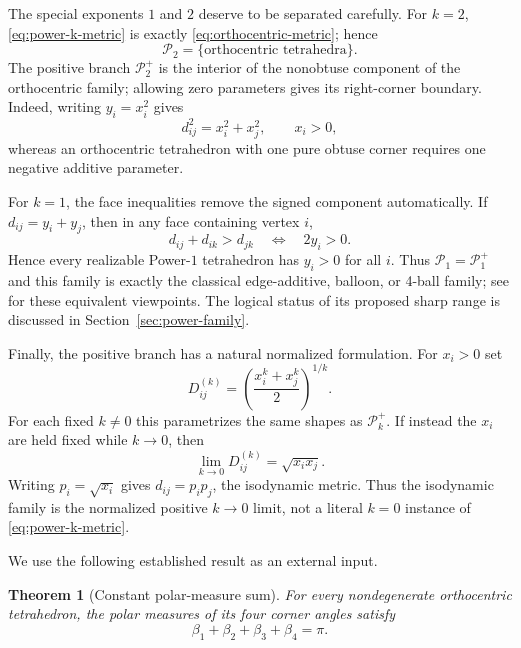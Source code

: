 \documentclass[11pt,a4paper]{article}
\newtheorem{theorem}{Theorem}[section]
\theoremstyle{definition}
\theoremstyle{remark}
\begin{document}
The special exponents $1$ and $2$ deserve to be separated carefully.
For $k=2$, \eqref{eq:power-k-metric} is exactly
\eqref{eq:orthocentric-metric}; hence
\begin{equation}\label{eq:p2-orthocentric}
 \mathcal P_2=\{\text{orthocentric tetrahedra}\}.
\end{equation}
The positive branch $\mathcal P_2^+$ is the interior of the nonobtuse
component of the orthocentric family; allowing zero parameters gives its
right-corner boundary.  Indeed, writing $y_i=x_i^2$ gives
\begin{equation}\label{eq:k2-family}
 d_{ij}^2=x_i^2+x_j^2,
 \qquad x_i>0,
\end{equation}
whereas an orthocentric tetrahedron with one pure obtuse corner requires one
negative additive parameter.

For $k=1$, the face inequalities remove the signed component automatically.
If $d_{ij}=y_i+y_j$, then in any face containing vertex $i$,
\[
 d_{ij}+d_{ik}>d_{jk}
 \quad\Longleftrightarrow\quad 2y_i>0.
\]
Hence every realizable Power-$1$ tetrahedron has $y_i>0$ for all $i$.  Thus
$\mathcal P_1=\mathcal P_1^+$ and this family is exactly the classical
edge-additive, balloon, or 4-ball family; see \cite{Katsuura2021} for these
equivalent viewpoints.  The logical status of its proposed sharp range is
discussed in Section~\ref{sec:power-family}.

Finally, the positive branch has a natural normalized formulation.  For
$x_i>0$ set
\begin{equation}\label{eq:power-mean-family}
 D_{ij}^{(k)}=\left(\frac{x_i^k+x_j^k}{2}\right)^{1/k}.
\end{equation}
For each fixed $k\ne0$ this parametrizes the same shapes as
$\mathcal P_k^+$.  If instead the $x_i$ are held fixed while $k\to0$, then
\begin{equation}\label{eq:k0-limit}
 \lim_{k\to0}D_{ij}^{(k)}=\sqrt{x_ix_j}.
\end{equation}
Writing $p_i=\sqrt{x_i}$ gives $d_{ij}=p_ip_j$, the isodynamic metric.  Thus
the isodynamic family is the normalized positive $k\to0$ limit, not a
literal $k=0$ instance of \eqref{eq:power-k-metric}.

We use the following established result as an external input.

\begin{theorem}[Constant polar-measure sum]\label{thm:polar-sum}
For every nondegenerate orthocentric tetrahedron, the polar measures of its
four corner angles satisfy
\begin{equation}\label{eq:polar-sum}
 \beta_1+\beta_2+\beta_3+\beta_4=\pi.
\end{equation}
\end{theorem}
\end{document}
